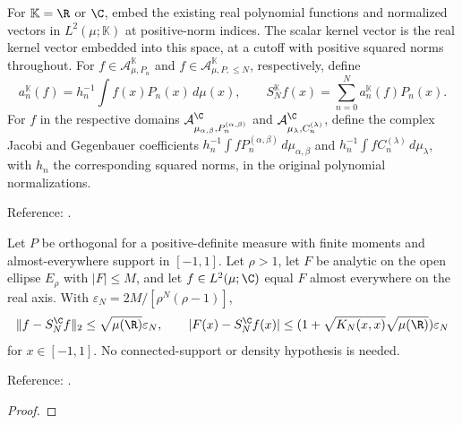 \begin{definition}
\label{def:scalar-orthogonal-coefficients}
\leanok
For $\mathbb K=\R$ or $\C$, embed the existing real polynomial functions and
normalized vectors in $L^2(\mu;\mathbb K)$ at positive-norm indices. The scalar kernel vector is the real kernel vector embedded into this space, at a cutoff with positive squared norms throughout. For $f\in\mathcal A_{\mu,P_n}^{\mathbb K}$ and $f\in\mathcal A_{\mu,P,\le N}^{\mathbb K}$, respectively, define
\[ a_n^{\mathbb K}(f)=h_n^{-1}\int f(x)P_n(x)\,d\mu(x),\qquad
 S_N^{\mathbb K}f(x)=\sum_{n=0}^N a_n^{\mathbb K}(f)P_n(x). \]
For $f$ in the respective domains $\mathcal A_{\mu_{\alpha,\beta},P_n^{(\alpha,\beta)}}^{\C}$ and $\mathcal A_{\mu_\lambda,C_n^{(\lambda)}}^{\C}$, define the complex Jacobi and Gegenbauer coefficients
$h_n^{-1}\int fP_n^{(\alpha,\beta)}\,d\mu_{\alpha,\beta}$ and
$h_n^{-1}\int fC_n^{(\lambda)}\,d\mu_\lambda$, with $h_n$ the corresponding
squared norms, in the original polynomial normalizations.

Reference: \cite[18.18]{dlmf}.
\end{definition}

\begin{theorem}
\label{thm:complex-weighted-approximation}
\leanok
Let $P$ be orthogonal for a positive-definite measure with finite moments and
almost-everywhere support in $[-1,1]$. Let $\rho>1$, let $F$ be analytic on the
open ellipse $E_\rho$ with $|F|\le M$, and let $f\in L^2(\mu;\C)$ equal $F$
almost everywhere on the real axis. With $\varepsilon_N=2M/[\rho^N(\rho-1)]$,
\[ \|f-S_N^{\C}f\|_2\le\sqrt{\mu(\R)}\varepsilon_N,\qquad
 |F(x)-S_N^{\C}f(x)|\le
 (1+\sqrt{K_N(x,x)}\sqrt{\mu(\R)})\varepsilon_N \]
for $x\in[-1,1]$. No connected-support or density hypothesis is needed.

Reference: \cite[Theorem 8.2]{atap}.
\end{theorem}
\begin{proof}
\leanok
\end{proof}

